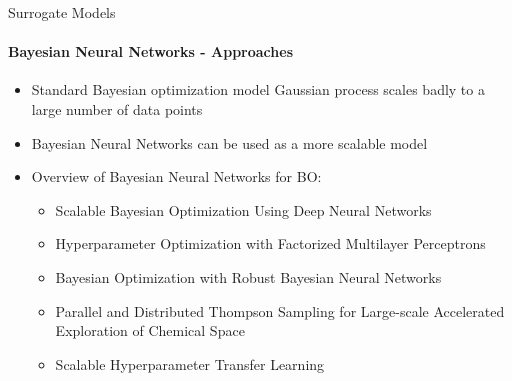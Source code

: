 \begin{frame}[c]{Surrogate Models}
\framesubtitle{Bayesian Neural Networks - Approaches}

\begin{itemize}
	\item Standard Bayesian optimization model Gaussian process scales badly to a large number of data points
	\item Bayesian Neural Networks can be used as a more scalable model\pause
	\bigskip
	\item Overview of Bayesian Neural Networks for BO:
	\begin{itemize}
	    \item {} Scalable Bayesian Optimization Using Deep Neural Networks
	    \item {} Hyperparameter Optimization with Factorized Multilayer Perceptrons
	    \item {} Bayesian Optimization with Robust Bayesian Neural Networks
	    \item {} Parallel and Distributed Thompson Sampling for Large-scale Accelerated Exploration of Chemical Space
        \item {} Scalable Hyperparameter Transfer Learning

	\end{itemize}
\end{itemize}

\end{frame}

